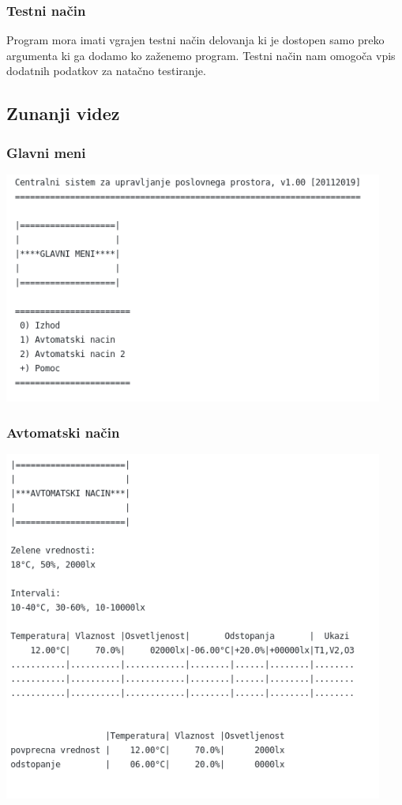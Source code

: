 \documentclass[a4paper,12pt]{article}
\begin{document}
			\subsubsection{Testni način}
				\qquad \qquad Program mora imati vgrajen testni način delovanja ki je dostopen samo preko argumenta
				ki ga dodamo ko zaženemo program. Testni način nam omogoča vpis dodatnih podatkov za natačno testiranje.
		

		\subsection{Zunanji videz}

			\subsubsection{Glavni meni}

				\includegraphics[width=12.5cm]{diagrami_slike/gl_meni.png}

			\subsubsection{Avtomatski način}

				\includegraphics[width=12.5cm]{diagrami_slike/avt_nac.png}
\end{document}
